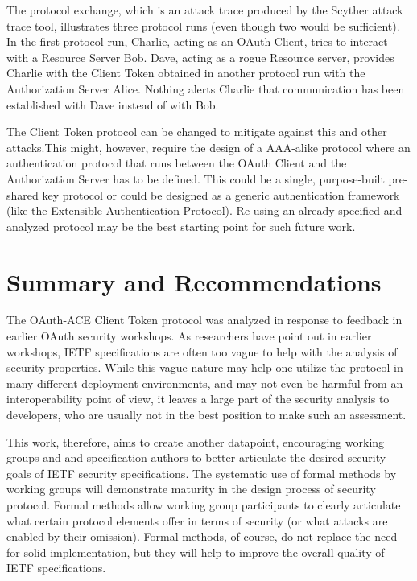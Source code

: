 \documentclass[peerreview, a4paper, 7pt]{IEEEtran}
\begin{document}
The protocol exchange, which is an attack trace produced by the Scyther attack trace tool, illustrates three protocol runs (even though two would be sufficient). In the first protocol run, Charlie, acting as an OAuth Client, tries to interact with a Resource Server Bob.  Dave, acting as a rogue Resource server, provides Charlie with the Client Token obtained in another protocol run with the Authorization Server Alice. Nothing alerts Charlie that communication has been established with Dave instead of with Bob.

The Client Token protocol can be changed to mitigate against this and other attacks.This might, however, require the design of a AAA-alike protocol where an authentication protocol that runs between the OAuth Client and the Authorization Server has to be defined. This could be a single, purpose-built pre-shared key protocol or could be designed as a generic authentication framework (like the Extensible Authentication Protocol). Re-using an already specified and analyzed protocol may be the best starting point for such future work. 

\section{Summary and Recommendations}

The OAuth-ACE Client Token protocol was analyzed in response to feedback in earlier OAuth security workshops. As researchers have point out in earlier workshops, IETF specifications are often too vague to help with the analysis of security properties. While this vague nature may help one utilize the protocol in many different deployment environments, and may not even be harmful from an interoperability point of view, it leaves a large part of the security analysis to developers, who are usually not in the best position to make such an assessment.

This work, therefore, aims to create another datapoint, encouraging working groups and and specification authors to better articulate the desired security goals of IETF security specifications. 
The systematic use of formal methods by working groups will demonstrate maturity in the design process of security protocol. Formal methods allow working group participants to clearly articulate what certain protocol elements offer in terms of security (or what attacks are enabled by their omission). Formal methods, of course, do not replace the need for solid implementation, but they will help to improve the overall quality of IETF specifications.
\end{document}
